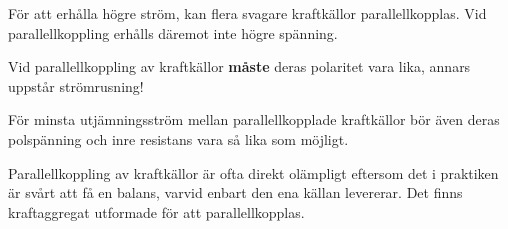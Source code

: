 För att erhålla högre ström, kan flera svagare kraftkällor parallellkopplas. Vid
parallellkoppling erhålls däremot inte högre spänning.

Vid parallellkoppling av kraftkällor \textbf{måste} deras polaritet vara lika,
annars uppstår strömrusning!

För minsta utjämningsström mellan parallellkopplade kraftkällor bör även deras
polspänning och inre resistans vara så lika som möjligt.

\begin{center}
\begin{minipage}{0.19\columnwidth}
\Huge{\selectfont{}\relax}
\end{minipage}
\begin{minipage}{0.7\columnwidth}
Parallellkoppling av kraftkällor är ofta direkt o\-läm\-p\-li\-gt eftersom det
i praktiken är svårt att få en balans, varvid enbart den ena källan levererar.
Det finns kraftaggregat utformade för att parallellkopplas.
\end{minipage}
\end{center}

